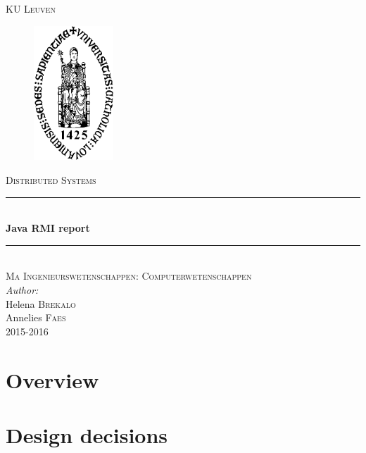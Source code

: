 \documentclass[10pt,a4paper]{report}
\author{Helena Brekalo and Annelies Faes}
\begin{document}
\begin{titlepage}

\newcommand{\HRule}{\rule{\linewidth}{0.5mm}} %

\center %
 
\textsc{\LARGE KU Leuven}\\[1.5cm] %


\begin{figure}[ht!]
\centering
\includegraphics[width=30mm]{logo_theo.png}
\label{les2_01}
\end{figure}

\textsc{\Large Distributed Systems}\\[0.5cm] %


\HRule \\[0.4cm]
{ \huge \bfseries Java RMI report}\\[0.4cm]
\HRule \\[1.5cm]


\textsc{\large Ma Ingenieurswetenschappen: Computerwetenschappen}\\[0.5cm] %


\Large \emph{Author:}\\
Helena \textsc{Brekalo}\\
Annelies \textsc{Faes}\\[2cm]


{\large 2015-2016}\\[3cm] %

\vfill %

\end{titlepage}
\clearpage

\section{Overview}

\section{Design decisions}
\end{document}
